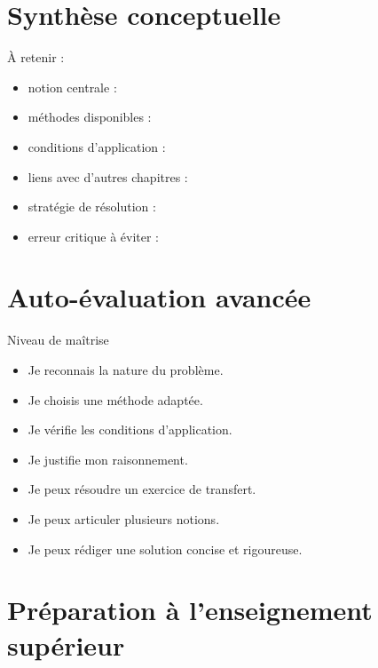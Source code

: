 \documentclass[11pt,a4paper]{article}
\begin{document}
\section{Synthèse conceptuelle}

\begin{cadresynthese}
À retenir :

\begin{itemize}
    \item notion centrale : \dotfill
    \item méthodes disponibles : \dotfill
    \item conditions d’application : \dotfill
    \item liens avec d’autres chapitres : \dotfill
    \item stratégie de résolution : \dotfill
    \item erreur critique à éviter : \dotfill
\end{itemize}
\end{cadresynthese}

\section{Auto-évaluation avancée}

\begin{cadregris}{Niveau de maîtrise}
\begin{itemize}
    \item[$\square$] Je reconnais la nature du problème.
    \item[$\square$] Je choisis une méthode adaptée.
    \item[$\square$] Je vérifie les conditions d’application.
    \item[$\square$] Je justifie mon raisonnement.
    \item[$\square$] Je peux résoudre un exercice de transfert.
    \item[$\square$] Je peux articuler plusieurs notions.
    \item[$\square$] Je peux rédiger une solution concise et rigoureuse.
\end{itemize}
\end{cadregris}

\section{Préparation à l’enseignement supérieur}
\end{document}
